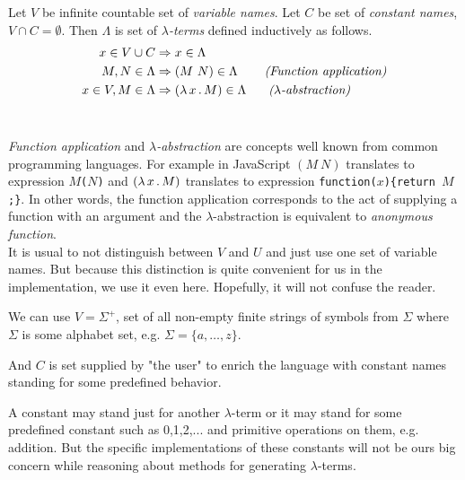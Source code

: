 \documentclass[12pt,a4paper]{report}
\newcommand{\lterm}{$\lambda$-term\xspace}
\newcommand{\lterms}{$\lambda$-terms\xspace}
\newcommand{\setDots}[2]{ 
	\lbrace #1 , \dots , #2 \rbrace
}
\begin{document}
\newcommand{\Scomb }{\mathbf{S}}
\newcommand{\Kcomb }{\mathbf{K}}
\newcommand{\Icomb }{\mathbf{I}}




\begin{definition}

Let $V$ be infinite countable set of {\it 
variable names}. Let $C$ be set of {\it constant names}, 
$V \cap C = \emptyset$.	 	
Then $\Lambda$ is set of {\it \lterms} defined inductively as follows.	
\begin{align*}
x   \in V \cup C  &\Rightarrow x     \in \Lambda \\
M,N \in \Lambda   &\Rightarrow (M~N) \in \Lambda 
\textit{~~~~~~(Function application)} \\
x   \in V , M \in \Lambda &\Rightarrow ( \lambda \, x \, . \, M ) \in \Lambda
\textit{~~~~~($\lambda$-abstraction)} 
\end{align*}~
\end{definition}



\textit{Function application} and 
\textit{$\lambda$-abstraction} are concepts
well known from common programming languages. 
For example in JavaScript 
$(M~N)$ translates to expression \texttt{$M$($N$)} and
$( \lambda \, x \, . \, M )$ translates to expression \texttt{function($x$)\{return $M$;\}}.
In other words, the function application 
corresponds to the act of supplying a function 
with an argument and
the $\lambda$-abstraction is equivalent to 
\textit{anonymous function}. \\

It is usual to not distinguish between $V$ and $U$ and just use
one set of variable names. But because this distinction is quite convenient
for us in the implementation, we use it even here. 
Hopefully, it will not confuse the reader.
 

We can use $V = \Sigma^+$, set of all non-empty finite strings of symbols 
from $\Sigma$ where $\Sigma$ is some alphabet set, e.g.  
$
\Sigma =
\setDots{a}{z}$.

And $C$ is set supplied by "the user" to enrich 
the language with constant names standing
for some predefined behavior.

A constant may stand just for another \lterm
or it may stand for some predefined constant 
such as 0,1,2,... and primitive operations on
them, e.g. addition. 
But the specific implementations 
of these constants will not be ours big concern 
while reasoning about methods for generating 
\lterms .\\
\end{document}
